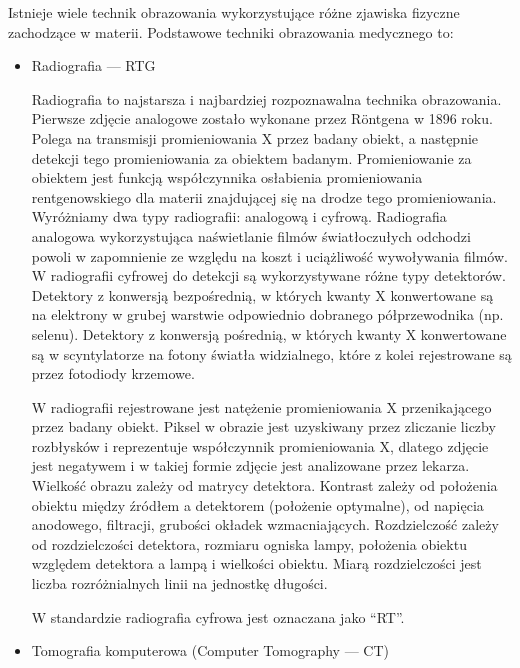 Istnieje wiele technik obrazowania wykorzystujące różne zjawiska fizyczne zachodzące w materii.
Podstawowe techniki obrazowania medycznego to:
\label{sec:basic-imaging-technics}
\begin{itemize}
    \item Radiografia --- RTG

          Radiografia to najstarsza i najbardziej rozpoznawalna technika obrazowania.
          Pierwsze zdjęcie analogowe zostało wykonane przez Röntgena w 1896 roku.
          Polega na transmisji promieniowania X przez badany obiekt, a następnie detekcji tego promieniowania za obiektem badanym.
          Promieniowanie za obiektem jest funkcją współczynnika osłabienia promieniowania rentgenowskiego dla materii znajdującej się na drodze tego promieniowania.
          Wyróżniamy dwa typy radiografii: analogową i cyfrową.
          Radiografia analogowa wykorzystująca naświetlanie filmów światłoczułych odchodzi powoli w zapomnienie ze względu na koszt i uciążliwość wywoływania filmów.
          W radiografii cyfrowej do detekcji są wykorzystywane różne typy detektorów.
          Detektory z konwersją bezpośrednią, w których kwanty X konwertowane są na elektrony w grubej warstwie odpowiednio dobranego półprzewodnika (np. selenu).
          Detektory z konwersją pośrednią, w których kwanty X konwertowane są w scyntylatorze na fotony światła widzialnego, które z kolei rejestrowane są przez fotodiody krzemowe.

          W radiografii rejestrowane jest natężenie promieniowania X przenikającego przez badany obiekt.
          Piksel w obrazie jest uzyskiwany przez zliczanie liczby rozbłysków i reprezentuje współczynnik promieniowania X, dlatego zdjęcie jest negatywem i w takiej formie zdjęcie jest analizowane przez lekarza.
          Wielkość obrazu zależy od matrycy detektora.
          Kontrast zależy od położenia obiektu między źródłem a detektorem (położenie optymalne), od napięcia anodowego, filtracji, grubości okładek wzmacniających.
          Rozdzielczość zależy od rozdzielczości detektora, rozmiaru ogniska lampy, położenia obiektu względem detektora a lampą i wielkości obiektu.
          Miarą rozdzielczości jest liczba rozróżnialnych linii na jednostkę długości.

          W standardzie \DICOM radiografia cyfrowa jest oznaczana jako \enquote{RT}.

    \item Tomografia komputerowa (Computer Tomography --- CT)


\end{itemize}
